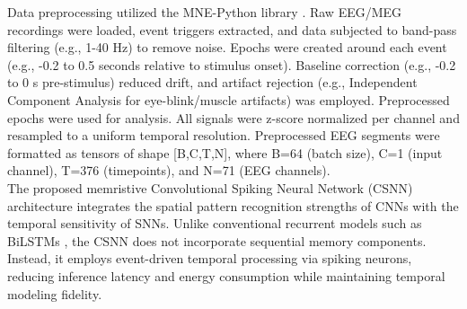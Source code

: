 
\noindent Data preprocessing utilized the MNE-Python library \cite{gramfort2014mne}. Raw EEG/MEG recordings were loaded, event triggers extracted, and data subjected to band-pass filtering (e.g., 1-40 Hz) to remove noise. Epochs were created around each event (e.g., -0.2 to 0.5 seconds relative to stimulus onset). Baseline correction (e.g., -0.2 to 0 s pre-stimulus) reduced drift, and artifact rejection (e.g., Independent Component Analysis for eye-blink/muscle artifacts) was employed. Preprocessed epochs were used for analysis. All signals were z-score normalized per channel and resampled to a uniform temporal resolution. Preprocessed EEG segments were formatted as tensors of shape [B,C,T,N], where B=64 (batch size), C=1 (input channel), T=376 (timepoints), and N=71 (EEG channels).\\


\noindent The proposed memristive Convolutional Spiking Neural Network (CSNN) architecture integrates the spatial pattern recognition strengths of CNNs with the temporal sensitivity of SNNs. Unlike conventional recurrent models such as BiLSTMs \cite{malviya2022novel}, the CSNN does not incorporate sequential memory components. Instead, it employs event-driven temporal processing via spiking neurons, reducing inference latency and energy consumption while maintaining temporal modeling fidelity.\\

